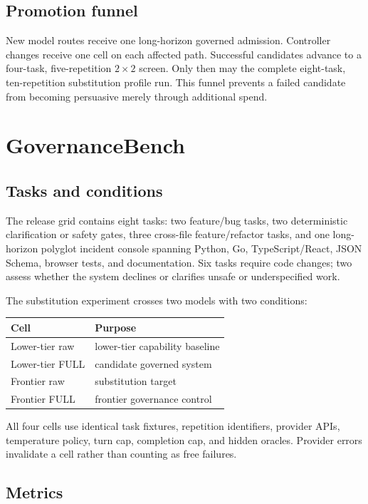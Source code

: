 \documentclass[10pt,twocolumn]{article}
\begin{document}
\subsection{Promotion funnel}

New model routes receive one long-horizon governed admission. Controller
changes receive one cell on each affected path. Successful candidates advance
to a four-task, five-repetition $2\times2$ screen. Only then may the complete
eight-task, ten-repetition substitution profile run. This funnel prevents a
failed candidate from becoming persuasive merely through additional spend.

\section{GovernanceBench}

\subsection{Tasks and conditions}

The release grid contains eight tasks: two feature/bug tasks, two deterministic
clarification or safety gates, three cross-file feature/refactor tasks, and one
long-horizon polyglot incident console spanning Python, Go, TypeScript/React,
JSON Schema, browser tests, and documentation. Six tasks require code changes;
two assess whether the system declines or clarifies unsafe or underspecified
work.

The substitution experiment crosses two models with two conditions:
\begin{center}
\begin{tabular}{ll}
\toprule
Cell & Purpose \\
\midrule
Lower-tier raw & lower-tier capability baseline \\
Lower-tier FULL & candidate governed system \\
Frontier raw & substitution target \\
Frontier FULL & frontier governance control \\
\bottomrule
\end{tabular}
\end{center}

All four cells use identical task fixtures, repetition identifiers, provider
APIs, temperature policy, turn cap, completion cap, and hidden oracles.
Provider errors invalidate a cell rather than counting as free failures.

\subsection{Metrics}
\end{document}
